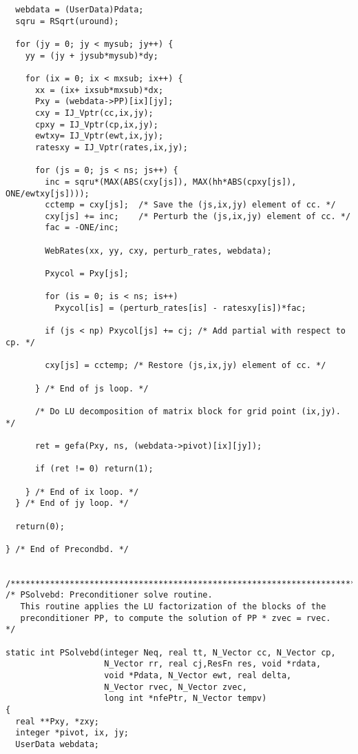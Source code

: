 \begin{verbatim}
  webdata = (UserData)Pdata;
  sqru = RSqrt(uround); 

  for (jy = 0; jy < mysub; jy++) {
    yy = (jy + jysub*mysub)*dy;

    for (ix = 0; ix < mxsub; ix++) {
      xx = (ix+ ixsub*mxsub)*dx;
      Pxy = (webdata->PP)[ix][jy];
      cxy = IJ_Vptr(cc,ix,jy); 
      cpxy = IJ_Vptr(cp,ix,jy); 
      ewtxy= IJ_Vptr(ewt,ix,jy);
      ratesxy = IJ_Vptr(rates,ix,jy);

      for (js = 0; js < ns; js++) {
        inc = sqru*(MAX(ABS(cxy[js]), MAX(hh*ABS(cpxy[js]), ONE/ewtxy[js])));
        cctemp = cxy[js];  /* Save the (js,ix,jy) element of cc. */
        cxy[js] += inc;    /* Perturb the (js,ix,jy) element of cc. */
        fac = -ONE/inc;
 
        WebRates(xx, yy, cxy, perturb_rates, webdata);

        Pxycol = Pxy[js];

        for (is = 0; is < ns; is++)
          Pxycol[is] = (perturb_rates[is] - ratesxy[is])*fac;

        if (js < np) Pxycol[js] += cj; /* Add partial with respect to cp. */

        cxy[js] = cctemp; /* Restore (js,ix,jy) element of cc. */

      } /* End of js loop. */

      /* Do LU decomposition of matrix block for grid point (ix,jy). */

      ret = gefa(Pxy, ns, (webdata->pivot)[ix][jy]);

      if (ret != 0) return(1);

    } /* End of ix loop. */
  } /* End of jy loop. */

  return(0);

} /* End of Precondbd. */


/*************************************************************************/
/* PSolvebd: Preconditioner solve routine.
   This routine applies the LU factorization of the blocks of the
   preconditioner PP, to compute the solution of PP * zvec = rvec.       */

static int PSolvebd(integer Neq, real tt, N_Vector cc, N_Vector cp,
                    N_Vector rr, real cj,ResFn res, void *rdata,
                    void *Pdata, N_Vector ewt, real delta,
                    N_Vector rvec, N_Vector zvec,
                    long int *nfePtr, N_Vector tempv)
{
  real **Pxy, *zxy;
  integer *pivot, ix, jy;
  UserData webdata;


\end{verbatim}
